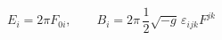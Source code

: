\begin{equation}
E_i=2\pi F_{0i},\qquad 
B_i=2\pi\,\frac{1}{2}\sqrt{-g}\,{\varepsilon}_{ijk}F^{jk} 
\label{bi4}
\end{equation}

